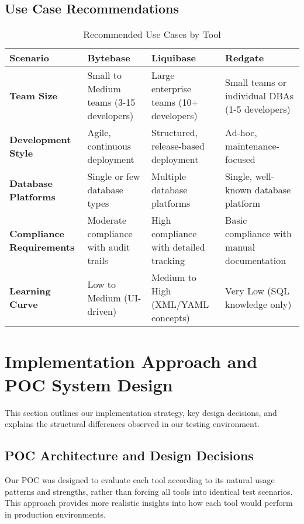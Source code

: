 \documentclass[11pt,a4paper]{article}
\begin{document}
\subsection{Use Case Recommendations}

\begin{table}[H]
\centering
\caption{Recommended Use Cases by Tool}
\begin{tabular}{|p{4cm}|p{4cm}|p{4cm}|p{4cm}|}
\hline
\textbf{Scenario} & \textbf{\textcolor{bytebase}{Bytebase}} & \textbf{\textcolor{liquibase}{Liquibase}} & \textbf{\textcolor{redgate}{Redgate}} \\
\hline
\textbf{Team Size} & 
Small to Medium teams (3-15 developers) & 
Large enterprise teams (10+ developers) & 
Small teams or individual DBAs (1-5 developers) \\
\hline
\textbf{Development Style} & 
Agile, continuous deployment & 
Structured, release-based deployment & 
Ad-hoc, maintenance-focused \\
\hline
\textbf{Database Platforms} & 
Single or few database types & 
Multiple database platforms & 
Single, well-known database platform \\
\hline
\textbf{Compliance Requirements} & 
Moderate compliance with audit trails & 
High compliance with detailed tracking & 
Basic compliance with manual documentation \\
\hline
\textbf{Learning Curve} & 
Low to Medium (UI-driven) & 
Medium to High (XML/YAML concepts) & 
Very Low (SQL knowledge only) \\
\hline
\end{tabular}
\end{table}

\section{Implementation Approach and POC System Design}

This section outlines our implementation strategy, key design decisions, and explains the structural differences observed in our testing environment.

\subsection{POC Architecture and Design Decisions}

Our POC was designed to evaluate each tool according to its natural usage patterns and strengths, rather than forcing all tools into identical test scenarios. This approach provides more realistic insights into how each tool would perform in production environments.
\end{document}
